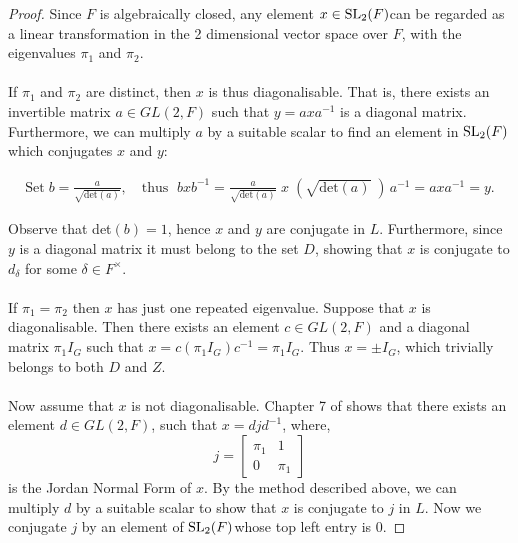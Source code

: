 \begin{proof}
\leanok Since $F$ is algebraically closed, any element $x \in \operatorname{SL}_2(F)$can be regarded as a linear transformation in the 2 dimensional vector space over $F$, with the eigenvalues $\pi_1$ and $\pi_2$. \\
\\
\space If $\pi_1$ and $\pi_2$ are distinct, then $x$ is thus diagonalisable. That is, there exists an invertible matrix $a \in GL(2, F)$ such that $y = axa^{-1}$ is a diagonal matrix. Furthermore, we can multiply $a$ by a suitable scalar to find an element in $\operatorname{SL}_2(F)$which conjugates $x$ and $y$:

\begin{align*}
    \text{Set} \; b = \frac{a}{\sqrt {\text{det}(a)}}, \quad \text{thus } \; bxb^{-1} =\frac{a}{\sqrt {\text{det}(a)}} \; x \; (\sqrt{\text{det}(a)} \; )\,a^{-1} = axa^{-1} = y.
\end{align*}

Observe that det$(b)=1$, hence $x$ and $y$ are conjugate in $L$. Furthermore, since $y$ is a diagonal matrix it must belong to the set $D$, showing that $x$ is conjugate to $d_\delta$ for some $\delta \in F^\times$. \\
\\
\space If $\pi_1 = \pi_2$ then $x$ has just one repeated eigenvalue. Suppose that $x$ is diagonalisable. Then there exists an element $c \in GL(2, F)$ and a diagonal matrix $\pi_1 I_G$ such that $x = c(\pi_1 I_G)c^{-1} = \pi_1 I_G$. Thus $x = \pm I_G$, which trivially belongs to both $D$ and $Z$. \\
\\
Now assume that $x$ is not diagonalisable. Chapter 7 of \cite{matrix} shows that there exists an element $d \in GL(2, F)$, such that $x= djd^{-1}$, where, $$j = \begin{bmatrix} \pi_1 & 1 \\ 0 & \pi_1 \end{bmatrix}$$ is the Jordan Normal Form of $x$. By the method described above, we can multiply $d$ by a suitable scalar to show that $x$ is conjugate to $j$ in $L$. Now we conjugate $j$ by an element of $\operatorname{SL}_2(F)$whose top left entry is 0.


\end{proof}
